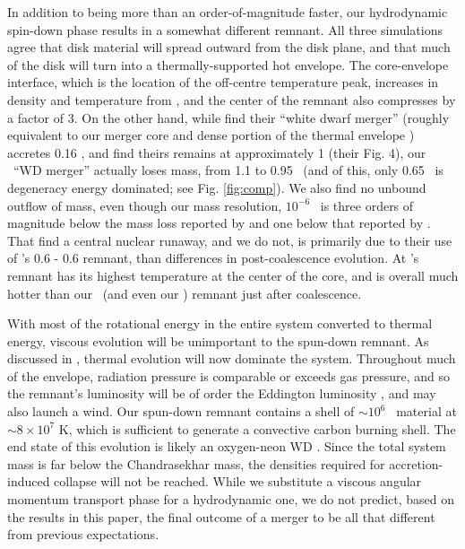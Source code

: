In addition to being more than an order-of-magnitude faster, our hydrodynamic spin-down phase results in a somewhat different remnant.  All three simulations agree that disk material will spread outward from the disk plane, and that much of the disk will turn into a thermally-supported hot envelope.  The core-envelope interface, which is the location of the off-centre temperature peak, increases in density and temperature from , and the center of the remnant also compresses by a factor of 3.  On the other hand, while \citeauthor{ji+13} find their ``white dwarf merger'' (roughly equivalent to our merger core and dense portion of the thermal envelope \gcc ) accretes 0.16 {\Msun}, and \citeauthor{schw+12} find theirs remains at approximately 1 {\Msun} (their Fig. 4), our \arepo\ ``WD merger'' actually loses mass, from 1.1 \Msun to 0.95 \Msun\ (and of this, only 0.65 \Msun\ is degeneracy energy dominated; see Fig. \ref{fig:comp}).  We also find no unbound outflow of mass, even though our mass resolution, $10^{-6}$ \Msun\, is three orders of magnitude below the mass loss reported by \citeauthor{ji+13} and one below that reported by \citeauthor{schw+12}.  That \cite{ji+13} find a central nuclear runaway, and we do not, is primarily due to their use of \cite{loreig09}'s 0.6 - 0.6 {\Msun} remnant, than differences in post-coalescence evolution.  At \citeauthor{loreig09}'s remnant has its highest temperature at the center of the core, and is overall much hotter than our \arepo\ (and even our \gasoline) remnant just after coalescence.

With most of the rotational energy in the entire system converted to thermal energy, viscous evolution will be unimportant to the spun-down remnant.  As discussed in \cite{shen+12}, thermal evolution will now dominate the system.  Throughout much of the envelope, radiation pressure is comparable or exceeds gas pressure, and so the remnant's luminosity will be of order the Eddington luminosity \citep{shen+12}, and may also launch a wind.  Our spun-down remnant contains a shell of $\sim10^6$ \gcc\ material at $\sim8\times10^7$ K, which is sufficient to generate a convective carbon burning shell.  The end state of this evolution is likely an oxygen-neon WD \citep{nomoi85, shen+12}.  Since the total system mass is far below the Chandrasekhar mass, the densities required for accretion-induced collapse will not be reached.  While we substitute a viscous angular momentum transport phase for a hydrodynamic one, we do not predict, based on the results in this paper, the final outcome of a merger to be all that different from previous expectations.

